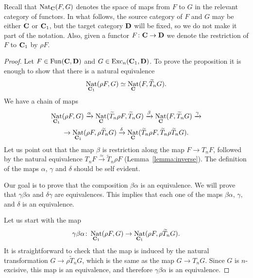 \documentclass[psamsfonts]{amsart}
\theoremstyle{plain}
\theoremstyle{definition}
\theoremstyle{remark}
\newcommand{\catname}[1]{{\normalfont\textbf{#1}}}
\DeclareMathOperator{\nat}{Nat}
\DeclareMathOperator{\fun}{Fun}
\DeclareMathOperator{\exc}{Exc}
\begin{document}
Recall that $\nat_{\catname{C}}(F, G)$ denotes the space of maps from $F$ to $G$ in the relevant category of functors. In what follows, the source category of $F$ and $G$ may be either $\catname{C}$ or $\catname{C}_1$, but the target category $\catname{D}$ will be fixed, so we do not make it part of the notation. Also, given a functor $F\colon \catname{C}\to \catname{D}$ we denote the restriction of $F$ to $\catname{C}_1$ by $\rho F$.
\begin{proof}
Let $F\in \fun(\catname{C}, \catname{D})$ and $G\in \exc_n(\catname{C}_1, \catname{D})$. To prove the proposition it is enough to show that there is a natural equivalence
\[
\nat_{\catname{C}_1}(\rho F, G) \simeq \nat_{\catname{C}}(F, \widetilde T_n G).
\]
We have a chain of maps
\begin{multline*}
\nat_{\catname{C}_1}(\rho F, G)\xrightarrow{\alpha} \nat_{\catname{C}}(\widetilde T_n\rho F, \widetilde T_nG)\xrightarrow{\beta}  \nat_{\catname{C}}(F, \widetilde T_nG)\xrightarrow{\gamma}  \\ \to \nat_{\catname{C}_1}(\rho F, \rho\widetilde T_n G) \xrightarrow{\delta} \nat_{\catname{C}}(\widetilde T_n \rho F, \widetilde T_n \rho \widetilde T_n G).
\end{multline*}
Let us point out that the map $\beta$ is restriction along the map $F\to T_nF$, followed by the natural equivalence $T_n F\xrightarrow{\simeq}\widetilde T_n\rho F$ (Lemma~\ref{lemma:inverse}). The definition of the maps $\alpha$, $\gamma$ and $\delta$ should be self evident.

Our goal is to prove that the composition $\beta\alpha$ is an equivalence. We will prove that $\gamma\beta\alpha$ and $\delta\gamma$ are equivalences. This implies that each one of the maps $\beta\alpha$, $\gamma$, and $\delta$ is an equivalence.

Let us start with the map
\[
\gamma\beta\alpha\colon \nat_{\catname{C}_1}(\rho F, G)\to \nat_{\catname{C}_1}(\rho F, \rho\widetilde T_n G).
\]
It is straightforward to check that the map is induced by the natural transformation $G\to \rho\widetilde T_n G$, which is the same as the map $G\to T_n G$. Since $G$ is $n$-excisive, this map is an equivalence, and therefore $\gamma\beta\alpha$ is an equivalence.


\end{proof}
\end{document}
